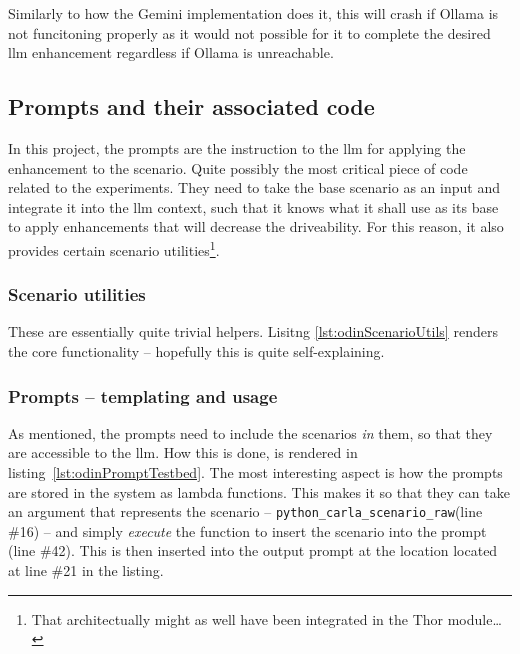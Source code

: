 Similarly to how the Gemini implementation does it, this will crash if Ollama is
not funcitoning properly as it would not possible for it to complete the desired
\acrshort{llm} enhancement regardless if Ollama is unreachable.



\subsection*{Prompts and their associated code}

In this project, the prompts are the instruction to the \acrfull{llm} for
applying the enhancement to the scenario. Quite possibly the most critical piece
of code related to the experiments. They need to take the base scenario as an
input and integrate it into the \acrshort{llm} context, such that it knows what
it shall use as its base to apply enhancements that will decrease the
driveability. For this reason, it also provides certain scenario
utilities\footnote{That architectually might as well have been integrated in the
    Thor module\ldots}.

\subsubsection{Scenario utilities}

These are essentially quite trivial helpers. Lisitng \ref{lst:odinScenarioUtils}
renders the core functionality -- hopefully this is quite self-explaining.



\subsubsection{Prompts -- templating and usage}

As mentioned, the prompts need to include the scenarios \emph{in} them, so that
they are accessible to the \acrshort{llm}. How this is done, is rendered in
listing~\ref{lst:odinPromptTestbed}. The most interesting aspect is how the
prompts are stored in the system as lambda functions. This makes it so that they
can take an argument that represents the scenario --
\texttt{python\_carla\_scenario\_raw}(line \#16) -- and simply \emph{execute} the
function to insert the scenario into the prompt (line \#42). This is then
inserted into the output prompt at the location located at line \#21 in the listing.

